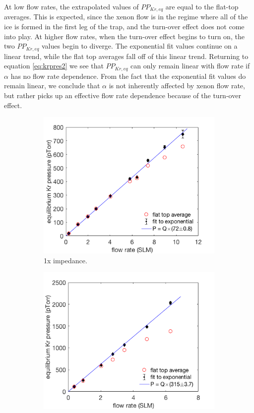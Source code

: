 At low flow rates, the extrapolated values of $PP_{Kr,eq}$ are equal to the flat-top averages. This is expected, since the xenon flow is in the regime where all of the ice is formed in the first leg of the trap, and the turn-over effect does not come into play. At higher flow rates, when the turn-over effect begins to turn on, the two $PP_{Kr,eq}$ values begin to diverge. The exponential fit values continue on a linear trend, while the flat top averages fall off of this linear trend. Returning to equation \ref{eq:krpres2} we see that $PP_{Kr,eq}$ can only remain linear with flow rate if $\alpha$ has no flow rate dependence. From the fact that the exponential fit values do remain linear, we conclude that $\alpha$ is not inherently affected by xenon flow rate, but rather picks up an effective flow rate dependence because of the turn-over effect.
\begin{figure}[h!]
\centering
\begin{subfigure}{0.5\textwidth}
  \centering
  \includegraphics[width=\textwidth]{Figures/SLAC_FlowResponse_1x_linfit.png}
  \caption{1x impedance.}
  \label{fig:flowresponse1x}
\end{subfigure}%
\begin{subfigure}{0.5\textwidth}
  \centering
  \includegraphics[width=\textwidth]{Figures/SLAC_FlowResponse_15x_linplot.png}

\end{subfigure}
\end{figure}
